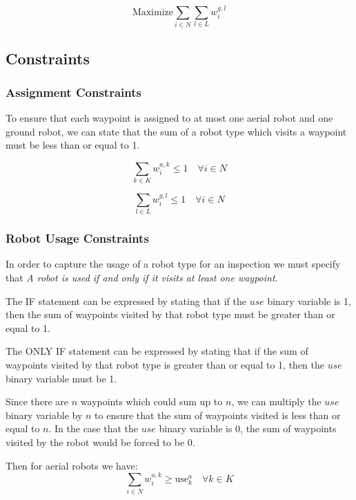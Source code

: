 \documentclass{article}
\begin{document}
			\begin{equation}
			\text{Maximize} \sum_{i \in N}\sum_{l \in L} w_i^{g,l}
			\end{equation}
		

		\subsection{Constraints}

			\subsubsection{Assignment Constraints}
			
				To ensure that each waypoint is assigned to at most one aerial robot and one ground robot, we can state that the sum of a robot type which visits a waypoint must be less than or equal to 1.

				\begin{equation}
				\sum_{k \in K} w_i^{a,k} \leq 1 \quad \forall i \in N
				\end{equation}

				\begin{equation}
				\sum_{l \in L} w_i^{g,l} \leq 1 \quad \forall i \in N
				\end{equation}

			\subsubsection{Robot Usage Constraints}

				In order to capture the usage of a robot type for an inspection we must specify that \textit{A robot is used if and only if it visits at least one waypoint}.

				The IF statement can be expressed by stating that if the $use$ binary variable is 1, then the sum of waypoints visited by that robot type must be greater than or equal to 1.

				The ONLY IF statement can be expressed by stating that if the sum of waypoints visited by that robot type is greater than or equal to 1, then the $use$ binary variable must be 1. 

				Since there are $n$ waypoints which could sum up to $n$, we can multiply the $use$ binary variable by $n$ to ensure that the sum of waypoints visited is less than or equal to $n$. In the case that the $use$ binary variable is 0, the sum of waypoints visited by the robot would be forced to be 0.

				Then for aerial robots we have:
				\begin{equation}
				\sum_{i \in N} w_i^{a,k} \geq \text{use}_k^a \quad \forall k \in K
				\end{equation}
\end{document}
